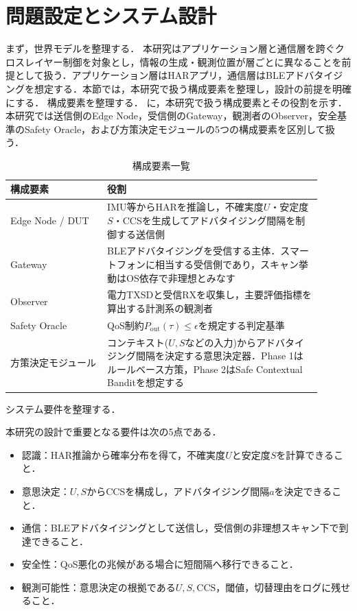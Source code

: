 ﻿%
\section{問題設定とシステム設計}

まず，世界モデルを整理する．
本研究はアプリケーション層と通信層を跨ぐクロスレイヤー制御を対象とし，情報の生成・観測位置が層ごとに異なることを前提として扱う．アプリケーション層はHARアプリ，通信層はBLEアドバタイジングを想定する．本節では，本研究で扱う構成要素を整理し，設計の前提を明確にする．
構成要素を整理する．
に，本研究で扱う構成要素とその役割を示す．本研究では送信側のEdge Node，受信側のGateway，観測者のObserver，安全基準のSafety Oracle，および方策決定モジュールの5つの構成要素を区別して扱う．

\begin{table}[tb]
  \centering
  \caption{構成要素一覧}
  \label{tab:actors}
  \begin{tabular}{p{0.28\linewidth}p{0.62\linewidth}}
    \toprule
    構成要素 & 役割 \\
    \midrule
    Edge Node / DUT & IMU等からHARを推論し，不確実度$U$・安定度$S$・CCSを生成してアドバタイジング間隔を制御する送信側 \\
    Gateway & BLEアドバタイジングを受信する主体．スマートフォンに相当する受信側であり，スキャン挙動はOS依存で非理想とみなす \\
    Observer & 電力TXSDと受信RXを収集し，主要評価指標を算出する計測系の観測者 \\
    Safety Oracle & QoS制約$P_{\mathrm{out}}(\tau)\le\epsilon$を規定する判定基準 \\
    方策決定モジュール & コンテキスト($U,S$などの入力)からアドバタイジング間隔を決定する意思決定器．Phase 1はルールベース方策，Phase 2はSafe Contextual Banditを想定する \\
    \bottomrule
  \end{tabular}
\end{table}
システム要件を整理する．

本研究の設計で重要となる要件は次の5点である．
\begin{itemize}
  \item 認識：HAR推論から確率分布を得て，不確実度$U$と安定度$S$を計算できること．
  \item 意思決定：$U,S$からCCSを構成し，アドバタイジング間隔$a$を決定できること．
  \item 通信：BLEアドバタイジングとして送信し，受信側の非理想スキャン下で到達できること．
  \item 安全性：QoS悪化の兆候がある場合に短間隔へ移行できること．
  \item 観測可能性：意思決定の根拠である$U,S,\mathrm{CCS}$，閾値，切替理由をログに残せること．
\end{itemize}

